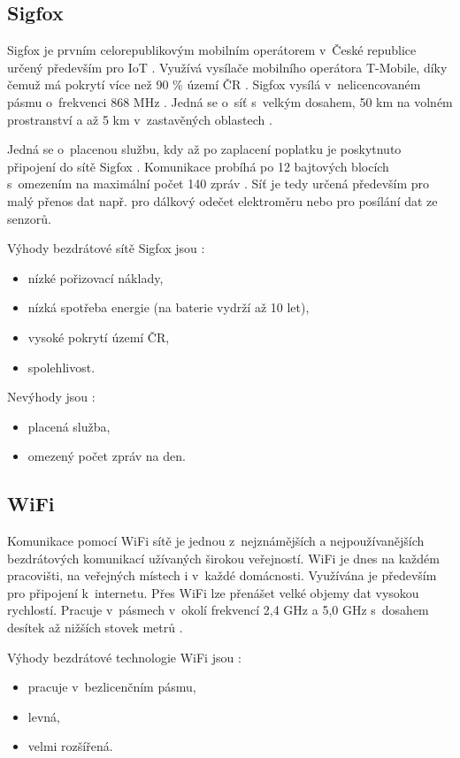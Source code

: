 \subsection{Sigfox}
Sigfox je prvním celorepublikovým mobilním operátorem v~České republice určený především pro IoT \cite{Sigfox_cz}. Využívá vysílače mobilního operátora T-Mobile, 
díky čemuž má pokrytí více než 90 \% území ČR \cite{Sigfox_Zooco}. Sigfox vysílá v~nelicencovaném pásmu o~frekvenci 868 MHz \cite{Sigfox_cz}. Jedná se o~síť 
s~velkým dosahem, 50 km na volném prostranství a až 5 km v~zastavěných oblastech \cite{Sigfox_Zooco}.  

Jedná se o~placenou službu, kdy až po zaplacení poplatku je poskytnuto připojení do sítě Sigfox \cite{Sigfox_Zooco}. Komunikace probíhá po 12 bajtových 
blocích s~omezením na maximální počet 140 zpráv \cite{Sigfox_Zooco}. Síť je tedy určená především pro malý přenos dat např. pro dálkový odečet elektroměru 
nebo pro posílání dat ze senzorů. 

Výhody bezdrátové sítě Sigfox jsou \cite{Sigfox_cz} \cite{Sigfox_Zooco}:
\begin{itemize}
  \item nízké pořizovací náklady,
  \item nízká spotřeba energie (na baterie vydrží až 10 let),
  \item vysoké pokrytí území ČR,
  \item spolehlivost.
\end{itemize}

Nevýhody jsou \cite{Sigfox_cz}:
\begin{itemize}
  \item placená služba,
  \item omezený počet zpráv na den.
\end{itemize}

\subsection{WiFi}
Komunikace pomocí WiFi sítě je jednou z~nejznámějších a nejpoužívanějších bezdrátových komunikací užívaných širokou veřejností. 
WiFi je dnes na každém pracovišti, na veřejných místech i v~každé domácnosti. Využívána je především pro připojení k~internetu. 
Přes WiFi lze přenášet velké objemy dat vysokou rychlostí. Pracuje v~pásmech v~okolí frekvencí 2,4 GHz a 5,0 GHz s~dosahem 
desítek až nižších stovek metrů \cite{Bezdrat_muni}. 

Výhody bezdrátové technologie WiFi jsou \cite{Bezdrat_muni}:
\begin{itemize}
  \item pracuje v~bezlicenčním pásmu, 
  \item levná, 
  \item velmi rozšířená.
\end{itemize}

